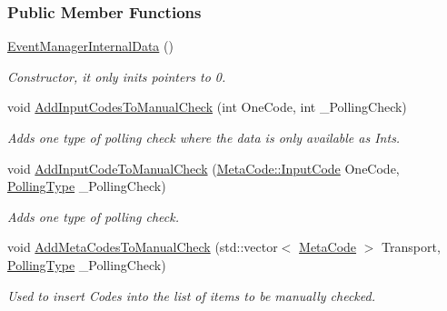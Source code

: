 \subsubsection*{Public Member Functions}
\begin{DoxyCompactItemize}
\item 
\hypertarget{structMezzanine_1_1internal_1_1EventManagerInternalData_a8ac76b5f7da9f44b5bb962ab9df125ad}{
\hyperlink{structMezzanine_1_1internal_1_1EventManagerInternalData_a8ac76b5f7da9f44b5bb962ab9df125ad}{EventManagerInternalData} ()}
\label{structMezzanine_1_1internal_1_1EventManagerInternalData_a8ac76b5f7da9f44b5bb962ab9df125ad}

\begin{DoxyCompactList}\small\item\em Constructor, it only inits pointers to 0. \item\end{DoxyCompactList}\item 
void \hyperlink{structMezzanine_1_1internal_1_1EventManagerInternalData_a0d72b807c1a1bd14194d173fcffa8d29}{AddInputCodesToManualCheck} (int OneCode, int \_\-PollingCheck)
\begin{DoxyCompactList}\small\item\em Adds one type of polling check where the data is only available as Ints. \item\end{DoxyCompactList}\item 
void \hyperlink{structMezzanine_1_1internal_1_1EventManagerInternalData_af1374a760ac44ce1b0a9e391f352a666}{AddInputCodeToManualCheck} (\hyperlink{classMezzanine_1_1MetaCode_a3b5633f0145bf3287cf53a3f05b5563c}{MetaCode::InputCode} OneCode, \hyperlink{structMezzanine_1_1internal_1_1EventManagerInternalData_a4179a167c7f67babd5aa4902dc279027}{PollingType} \_\-PollingCheck)
\begin{DoxyCompactList}\small\item\em Adds one type of polling check. \item\end{DoxyCompactList}\item 
void \hyperlink{structMezzanine_1_1internal_1_1EventManagerInternalData_a5724fa02574b031b4faf3f28a2cc66fa}{AddMetaCodesToManualCheck} (std::vector$<$ \hyperlink{classMezzanine_1_1MetaCode}{MetaCode} $>$ Transport, \hyperlink{structMezzanine_1_1internal_1_1EventManagerInternalData_a4179a167c7f67babd5aa4902dc279027}{PollingType} \_\-PollingCheck)
\begin{DoxyCompactList}\small\item\em Used to insert Codes into the list of items to be manually checked. \item\end{DoxyCompactList}\item 

\end{DoxyCompactItemize}
